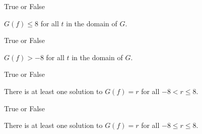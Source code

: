 \documentclass{ximera}
\begin{document}
\begin{exercise}
\begin{question} True or False

$G(f) \leq 8$ for all $t$ in the domain of $G$.

\begin{multipleChoice}
\end{multipleChoice}
\end{question}








\begin{question} True or False

$G(f) > -8$ for all $t$ in the domain of $G$.

\begin{multipleChoice}
\end{multipleChoice}
\end{question}






\begin{question} True or False

There is at least one solution to $G(f) = r$ for all $-8 < r \leq 8$.

\begin{multipleChoice}
\end{multipleChoice}
\end{question}






\begin{question} True or False

There is at least one solution to $G(f) = r$ for all $-8 \leq r \leq 8$.

\begin{multipleChoice}
\end{multipleChoice}
\end{question}







\end{exercise}
\end{document}
